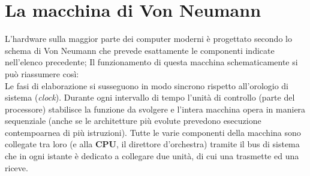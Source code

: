 \section{La macchina di Von Neumann}
L’hardware sulla maggior parte dei computer moderni è progettato secondo lo schema di Von Neumann che prevede esattamente le componenti indicate nell'elenco precedente; Il funzionamento di questa macchina schematicamente si può riassumere così:\\
Le fasi di elaborazione si susseguono in modo sincrono rispetto all'orologio di sistema (\textit{clock}). Durante ogni intervallo di tempo l’unità di controllo (parte del processore) stabilisce la funzione da svolgere e l’intera macchina opera in maniera sequenziale (anche se le architetture più evolute prevedono esecuzione contempoarnea di più istruzioni). Tutte le varie componenti della macchina sono collegate tra loro (e alla \textbf{CPU}, il direttore d'orchestra) tramite il bus di sistema che in ogni istante è dedicato a collegare due unità, di cui una trasmette ed una riceve.

